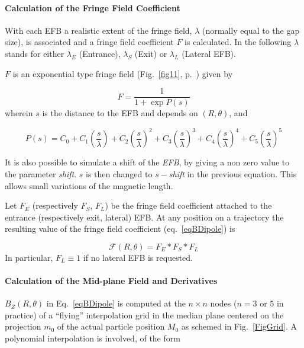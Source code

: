 {\paragraph{Calculation of the Fringe Field Coefficient} 

\noindent With  each EFB a realistic extent of the fringe field, $\lambda$ 
(normally equal to the gap size), is associated and a fringe field coefficient
$ F $ is calculated. In the following $\lambda$ stands for either $ \lambda_ E $
(Entrance), $ \lambda_ S $ (Exit) or $ \lambda_ L $ (Lateral EFB).  


\bigskip

\noindent$ F $ is an exponential type fringe field (Fig.~\ref{fig11}, p.~\pageref{fig11}) 
given by~\cite{Biblio12}     %

$$ F = \dfrac{1 }{ 1+ \exp P(s)} $$
%
 wherein $ s $ is the distance to the EFB and depends on $(R,\theta)$, and 

$$
    P(s) = C_0
       +C_1 \left(  \dfrac{s }{ \lambda} \right) 
       +C_2 \left( \dfrac{s }{ \lambda} \right)^2 
       + C_3 \left( \dfrac{s }{ \lambda} \right)^3 
       +C_4 \left( \dfrac{s }{ \lambda} \right)^4 
       + C_5 \left(\dfrac{s }{ \lambda} \right)^5 $$
       
\noindent It is also possible to simulate a shift of the \textsl{EFB}, by giving a non
zero value to the parameter \textsl{shift}.  $ s $ is then changed to $ s -$\textsl{shift} in the 
previous equation.   This allows small variations of the magnetic length.  
\bigskip

\noindent Let $ F_E $ (respectively $ F_S$, $F_L$)  be the fringe field
coefficient attached to the entrance (respectively exit, lateral) EFB. At any position on  a 
trajectory the resulting value of the fringe field coefficient (eq.~\ref{eqBDipole}) is

$$  \mathcal{F}(R,\theta) = F_E  \ast  F_S \ast   F_L $$
%
In particular, $F_L\equiv 1 $  if no lateral EFB is requested. 



\bigskip


\paragraph{Calculation of the  Mid-plane Field and Derivatives }

\noindent $ B_Z(R,\theta)$ in Eq.~\ref{eqBDipole} is 
computed at  the $n\times n$ nodes  ($n=3$ or $5$ in practice)  
of a ``flying'' interpolation grid in the median plane centered on the projection $m_0$ of 
the actual particle position $M_0$ as schemed 
in Fig.~\ref{FigGrid}. A polynomial interpolation is involved, of the form 

}
